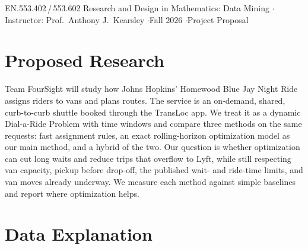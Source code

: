 \documentclass{article}
\begin{document}

  \begin{icmlauthorlist}
  \end{icmlauthorlist}


\vskip 0.05in
\begin{center}\small
EN.553.402\,/\,553.602 Research and Design in Mathematics: Data Mining \quad$\cdot$\quad Instructor: Prof.\ Anthony J.\ Kearsley \quad$\cdot$\quad Fall 2026 \quad$\cdot$\quad Project Proposal
\end{center}

\vskip -0.25in
\section{Proposed Research}
\vskip -0.1in

Team FourSight will study how Johns Hopkins' Homewood Blue Jay Night Ride assigns riders to vans and plans routes. The service is an on-demand, shared, curb-to-curb shuttle booked through the TransLoc app. We treat it as a dynamic Dial-a-Ride Problem with time windows and compare three methods on the same requests: fast assignment rules, an exact rolling-horizon optimization model as our main method, and a hybrid of the two. Our question is whether optimization can cut long waits and reduce trips that overflow to Lyft, while still respecting van capacity, pickup before drop-off, the published wait- and ride-time limits, and van moves already underway. We measure each method against simple baselines and report where optimization helps.

\vskip -0.1in
\section{Data Explanation}
\vskip -0.1in
\end{document}
